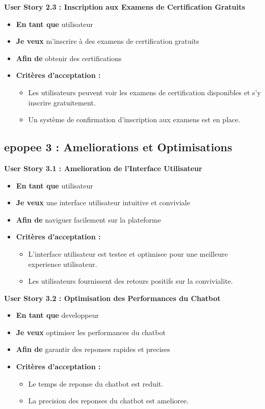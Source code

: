 \documentclass[a4paper, 11pt, openany]{report}
\begin{document}
\textbf{User Story 2.3 : Inscription aux Examens de Certification Gratuits}
\begin{itemize}
    \item \textbf{En tant que} utilisateur
    \item \textbf{Je veux} m'inscrire à des examens de certification gratuits
    \item \textbf{Afin de} obtenir des certifications
    \item \textbf{Critères d'acceptation :}
    \begin{itemize}
        \item Les utilisateurs peuvent voir les examens de certification disponibles et s'y inscrire gratuitement.
        \item Un système de confirmation d'inscription aux examens est en place.
    \end{itemize}
\end{itemize}

\subsection{epopee 3 : Ameliorations et Optimisations}

\textbf{User Story 3.1 : Amelioration de l'Interface Utilisateur}
\begin{itemize}
    \item \textbf{En tant que} utilisateur
    \item \textbf{Je veux} une interface utilisateur intuitive et conviviale
    \item \textbf{Afin de} naviguer facilement sur la plateforme
    \item \textbf{Critères d'acceptation :}
    \begin{itemize}
        \item L'interface utilisateur est testee et optimisee pour une meilleure experience utilisateur.
        \item Les utilisateurs fournissent des retours positifs sur la convivialite.
    \end{itemize}
\end{itemize}

\textbf{User Story 3.2 : Optimisation des Performances du Chatbot}
\begin{itemize}
    \item \textbf{En tant que} developpeur
    \item \textbf{Je veux} optimiser les performances du chatbot
    \item \textbf{Afin de} garantir des reponses rapides et precises
    \item \textbf{Critères d'acceptation :}
    \begin{itemize}
        \item Le temps de reponse du chatbot est reduit.
        \item La precision des reponses du chatbot est amelioree.
    \end{itemize}
\end{itemize}
\end{document}
